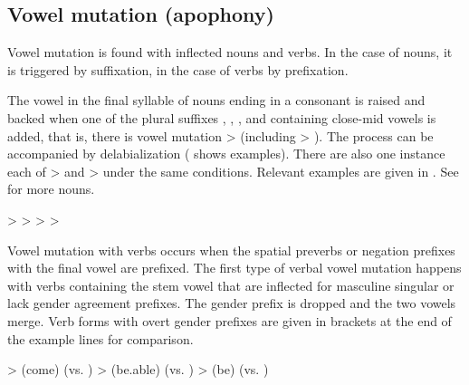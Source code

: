 \subsection{Vowel mutation (apophony)}
\label{ssec:Vowel mutation (apophony)}

Vowel mutation is found with inflected nouns and verbs. In the case of nouns, it is triggered by suffixation, in the case of verbs by prefixation.

The vowel  in the final syllable of nouns ending in a consonant is raised and backed when one of the plural suffixes , , , and  containing close-mid vowels is added, that is, there is vowel mutation  >  (including  > ). The process can be accompanied by delabialization ( shows examples). There are also one instance each of  >  and  >  under the same conditions. Relevant examples are given in . See  for more nouns.
%
\begin{exe}
	\label{ex:a u e u e i phon}
	\begin{xlist}
		\ex	{} >  
		\ex	{} >  
		\ex	{} >  
		\ex	{} >  
	\end{xlist}
\end{exe}

Vowel mutation with verbs occurs when the spatial preverbs or negation prefixes with the final vowel  are prefixed. The first type of verbal vowel mutation happens with verbs containing the stem vowel  that are inflected for masculine singular or lack gender agreement prefixes. The gender prefix is dropped and the two vowels merge. Verb forms with overt gender prefixes are given in brackets at the end of the example lines for comparison.
%
\begin{exe}
	\label{ex:a i e phon}
	\begin{xlist}
		\ex	{} >   (come) (vs. \tit{sa-b-irʁ-an}) 
		\ex	{} >   (be.able) (vs. \tit{a-b-irχʷ-ar})
		\ex	{} >   (be) (vs. \tit{ka-r-irg-an=da})
	\end{xlist}
\end{exe}

